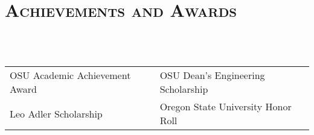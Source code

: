 \documentclass[letterpaper,10pt,titlepage]{article}
\begin{document}
\section*{\textsc{Achievements and Awards}}
~\\
~\\
\begin{tabularx}{\linewidth}{>{\centering\arraybackslash}X|>{\centering\arraybackslash}X}
OSU Academic Achievement Award & OSU Dean's Engineering Scholarship \\
Leo Adler Scholarship & Oregon State University Honor Roll\\
\end{tabularx}
\end{document}
